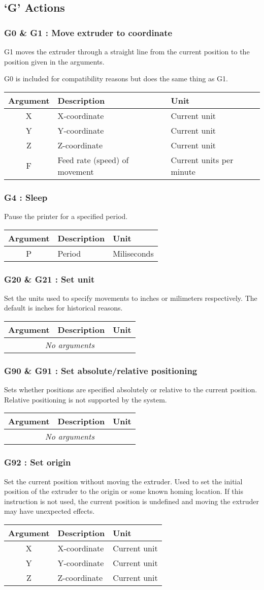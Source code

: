 		\newcommand{\gcodeaction}[4]{
			\subsubsection{#1 : #2}
				#3
				
				\begin{table}[H]
					\begin{tabular}{c p{0.41\textwidth} p{0.41\textwidth}}
						\toprule
						Argument & Description & Unit \\
						\midrule
						#4
						\bottomrule
					\end{tabular}
				\end{table}
		}
		\newcommand{\gcodearg}[3]{#1 & #2 & #3 \\}
		\newcommand{\gcodenoargs}{\multicolumn{3}{c}{\emph{No arguments}}\\}
		
		\subsection{`G' Actions}
			
			\gcodeaction{G0 \& G1}{Move extruder to coordinate}{
				G1 moves the extruder through a straight line from the current position
				to the position given in the arguments.
				
				G0 is included for compatibility reasons but does the same thing as G1.
			}{
				\gcodearg{X}{X-coordinate}{Current unit}
				\gcodearg{Y}{Y-coordinate}{Current unit}
				\gcodearg{Z}{Z-coordinate}{Current unit}
				\gcodearg{F}{Feed rate (speed) of movement}{Current units per minute}
			}
			
			\gcodeaction{G4}{Sleep}{
				Pause the printer for a specified period.
			}{
				\gcodearg{P}{Period}{Miliseconds}
			}
			
			\gcodeaction{G20 \& G21}{Set unit}{
				Set the units used to specify movements to inches or milimeters
				respectively. The default is inches for historical reasons.
			}{
				\gcodenoargs
			}
			
			\gcodeaction{G90 \& G91}{Set absolute/relative positioning}{
				Sets whether positions are specified absolutely or relative to the
				current position. Relative positioning is not supported by the system.
			}{
				\gcodenoargs
			}
			
			\gcodeaction{G92}{Set origin}{
				Set the current position without moving the extruder. Used to set the
				initial position of the extruder to the origin or some known homing
				location. If this instruction is not used, the current position is
				undefined and moving the extruder may have unexpected effects.
			}{
				\gcodearg{X}{X-coordinate}{Current unit}
				\gcodearg{Y}{Y-coordinate}{Current unit}
				\gcodearg{Z}{Z-coordinate}{Current unit}
			}
		
